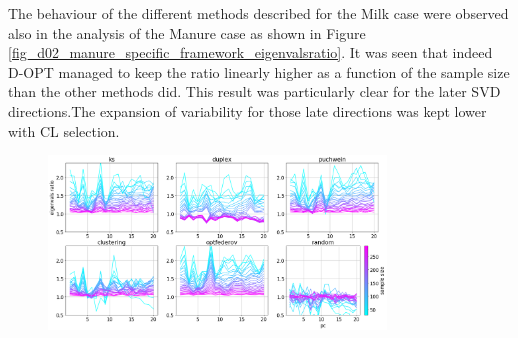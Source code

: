 \documentclass{article}
\begin{document}
The behaviour of the different methods described for the Milk case were observed also in the analysis of the Manure case as shown in Figure \ref{fig_d02_manure_specific_framework_eigenvalsratio}. It was seen that indeed D-OPT managed to keep the ratio linearly higher as a function of the sample size than the other methods did. This result was particularly clear for the later SVD directions.The expansion of variability for those late directions was kept lower with CL selection.  



\begin{figure}[t]
    \centering
    \caption{}
    \label{fig_specific_framework_detereigevect}
\end{figure}

\begin{figure}[b]
\includegraphics[width=0.8\textwidth]{manuscript/figures/d01_milk_specific_framework_eigenvalsratio.png}
\centering
\caption{}
\label{fig_d01_milk_specific_framework_eigenvalsratio}
\end{figure}
\end{document}
